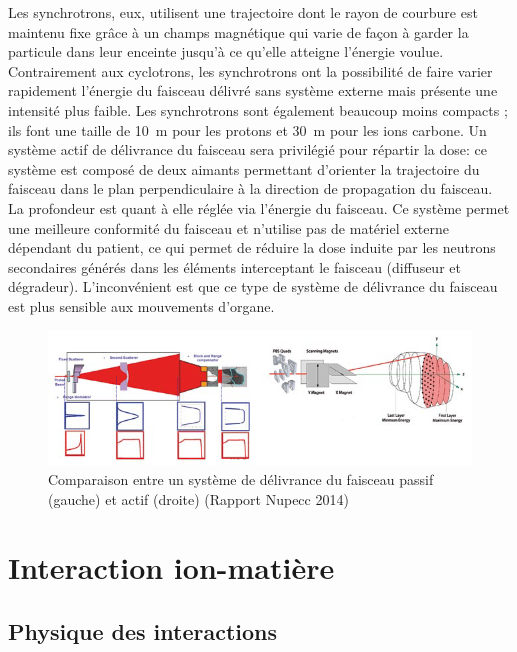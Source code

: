 \documentclass[11pt,a4paper,oldfontcommands]{memoir}
\begin{document}
Les synchrotrons, eux, utilisent une trajectoire dont le rayon de courbure est maintenu fixe grâce à un champs magnétique qui varie de façon à garder la particule dans leur enceinte jusqu'à ce qu'elle atteigne l'énergie voulue. Contrairement aux cyclotrons, les synchrotrons ont la possibilité de faire varier rapidement l'énergie du faisceau délivré sans système externe mais présente une intensité plus faible. Les synchrotrons sont également beaucoup moins compacts ; ils font une taille de 10~m pour les protons et 30~m pour les ions carbone. Un système actif de délivrance du faisceau sera privilégié pour répartir la dose: ce système est composé de deux aimants permettant d'orienter la trajectoire du faisceau dans le plan perpendiculaire à la direction de propagation du faisceau. La profondeur est quant à elle réglée via l'énergie du faisceau. Ce système permet une meilleure conformité du faisceau et n'utilise pas de matériel externe dépendant du patient, ce qui permet de réduire la dose induite par les neutrons secondaires générés dans les éléments interceptant le faisceau (diffuseur et dégradeur). L'inconvénient est que ce type de système de délivrance du faisceau est plus sensible aux mouvements d'organe. 

\begin{figure}[h!]
    \centering
    \includegraphics [scale = 0.7]{intro/Passive-left-and-active-right-beam-delivery-system-courtesy-of-IBA.png}
    \caption{Comparaison entre un système de délivrance du faisceau passif (gauche) et actif (droite) (Rapport Nupecc 2014)}
    \label{fig:my_label}
\end{figure}
\openany
\section{Interaction ion-matière}
\subsection{Physique des interactions}
\end{document}
